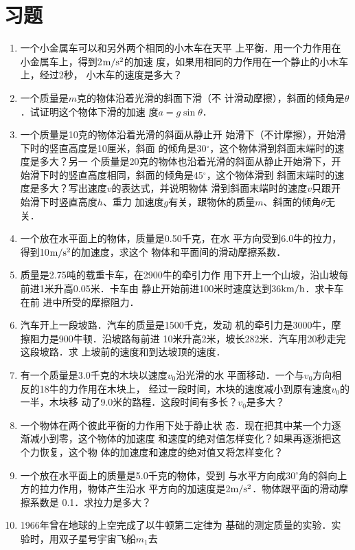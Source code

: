 \section*{习题}
\begin{enumerate}
    \item 一个小金属车可以和另外两个相同的小木车在天平
上平衡．用一个力作用在小金属车上，得到2$\text{m}/\text{s}^2$的加速
度，如果用相同的力作用在一个静止的小木车上，经过2秒，
小木车的速度是多大？

\item  一个质量是$m$克的物体沿着光滑的斜面下滑（不
计滑动摩擦），斜面的倾角是$\theta$．试证明这个物体下滑的加速
度$a=g\sin\theta$．
\item  一个质量是10克的物体沿着光滑的斜面从静止开
始滑下（不计摩擦），开始滑下时的竖直高度是10厘米，斜面
的倾角是30$^\circ$，这个物体滑到斜面末端时的速度是多大？另一
个质量是20克的物体也沿着光滑的斜面从静止开始滑下，开
始滑下时的竖直高度相同，斜面的倾角是45$^\circ$，这个物体滑到
斜面末端时的速度是多大？写出速度$v$的表达式，并说明物体
滑到斜面末端时的速度$v$只跟开始滑下时竖直高度$h$、重力
加速度$g$有关，跟物休的质量$m$、斜面的倾角$\theta$无关．
\item  一个放在水平面上的物体，质量是0.50千克，在水
平方向受到6.0牛的拉力，得到10$\text{m}/\text{s}^2$的加速度，求这个
物体和平面间的滑动摩擦系数．
\item   质量是2.75吨的载重卡车，在2900牛的牵引力作
用下开上一个山坡，沿山坡每前进1米升高0.05米．卡车由
静止开始前进100米时速度达到36$\text{km}/\text{h}$．求卡车在前
进中所受的摩擦阻力．
\item  汽车开上一段坡路．汽车的质量是1500千克，发动
机的牵引力是3000牛，摩擦阻力是900牛顿．沿坡路每前进
10米升高2米，坡长282米．汽车用20秒走完这段坡路．求
上坡前的速度和到达坡顶的速度．
\item  有一个质量是3.0千克的木块以速度$v_0$沿光滑的水
平面移动．一个与$v_0$方向相反的18牛的力作用在木块上，
经过一段时间，木块的速度减小到原有速度$v_0$的一半，木块移
动了9.0米的路程．这段时间有多长？$v_0$是多大？
\item  一个物体在两个彼此平衡的力作用下处于静止状
态．现在把其中某一个力逐渐减小到零，这个物体的加速度
和速度的绝对值怎样变化？如果再逐浙把这个力恢复，这个物
体的加速度和速度的绝对值又将怎样变化？
\item  一个放在水平面上的质量是5.0千克的物体，受到
与水平方向成30$^{\circ}$角的斜向上方的拉力作用，物体产生沿水
平方向的加速度是2$\text{m}/\text{s}^2$．物体跟平面的滑动摩擦系数是
0.1．求拉力是多大？
\item  1966年曾在地球的上空完成了以牛顿第二定律为
基础的测定质量的实验．实验时，用双子星号宇宙飞船$m_1$去

\end{enumerate}
